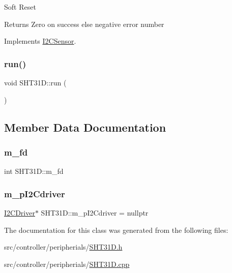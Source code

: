Soft Reset

\begin{DoxyReturn}{Returns}
Zero on success else negative error number 
\end{DoxyReturn}


Implements \hyperlink{classI2CSensor_a0622266d335944782d2bfa6352f01095}{I2\+C\+Sensor}.

\mbox{\label{classSHT31D_a1cb98e435a44e2b6beeb3d0226cc9ec8}} 
\subsubsection{\texorpdfstring{run()}{run()}}
{\footnotesize\ttfamily void S\+H\+T31\+D\+::run (\begin{DoxyParamCaption}{ }\end{DoxyParamCaption})\hspace{0.3cm}{\ttfamily [private]}}



\subsection{Member Data Documentation}
\mbox{\label{classSHT31D_a2740f957337c1944421401643a6a15b6}} 
\subsubsection{\texorpdfstring{m\+\_\+fd}{m\_fd}}
{\footnotesize\ttfamily int S\+H\+T31\+D\+::m\+\_\+fd\hspace{0.3cm}{\ttfamily [private]}}

\mbox{\label{classSHT31D_ad76767dc72097d43aea68675ae33e1ed}} 
\subsubsection{\texorpdfstring{m\+\_\+p\+I2\+Cdriver}{m\_pI2Cdriver}}
{\footnotesize\ttfamily \hyperlink{classI2CDriver}{I2\+C\+Driver}$\ast$ S\+H\+T31\+D\+::m\+\_\+p\+I2\+Cdriver = nullptr\hspace{0.3cm}{\ttfamily [private]}}



The documentation for this class was generated from the following files\+:\begin{DoxyCompactItemize}
\item 
src/controller/peripherials/\hyperlink{SHT31D_8h}{S\+H\+T31\+D.\+h}\item 
src/controller/peripherials/\hyperlink{SHT31D_8cpp}{S\+H\+T31\+D.\+cpp}\end{DoxyCompactItemize}
